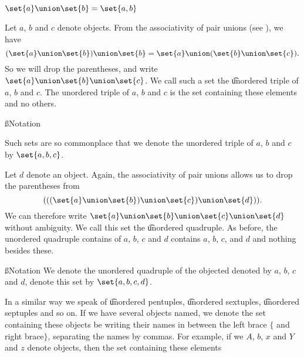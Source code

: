 

$\set{a} \union \set{b} = \set{a, b}$


Let $a$, $b$ and $c$ denote objects.
From the associativity of pair unions (see ), we have
\[
  (\set{a} \union \set{b}) \union \set{b} = \set{a} \union (\set{b} \union \set{c}).
\]
So we will drop the parentheses, and write $\set{a} \union \set{b} \union \set{c}$.
We call such a set the \t{unordered triple} of $a$, $b$ and $c$.
The unordered triple of $a$, $b$ and $c$ is the set containing these elements and no others.

\ss{Notation}

Such sets are so commonplace that we denote the unordered triple of $a$, $b$ and $c$ by $\set{a, b, c}$.


Let $d$ denote an object.
Again, the associativity of pair unions allows us to drop the parentheses from 
\[
  (((\set{a} \union \set{b}) \union \set{c}) \union \set{d})).
\]
We can therefore write $\set{a} \union \set{b} \union \set{c} \union \set{d}$ without ambiguity.
We call this set the \t{unordered quadruple}.
As before, the unordered quadruple contains of $a$, $b$, $c$ and $d$ contains $a$, $b$, $c$, and $d$ and nothing besides these.

\ss{Notation} 
We denote the unordered quadruple of the objected denoted by $a$, $b$, $c$ and $d$, denote this set by $\set{a, b, c, d}$.


In a similar way we speak of \t{unordered pentuples}, \t{unordered sextuples}, \t{unordered septuples} and so on.
If we have several objects named, we denote the set containing these objects be writing their names in between the left brace $\{$ and right brace$\}$, separating the names by commas.
For example, if we $A$, $b$, $x$ and $Y$ and $z$ denote objects, then the set containing these elements
